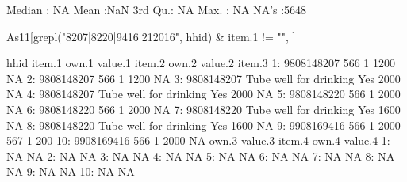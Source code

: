 \begin{Schunk}
\begin{Soutput}
 Median : NA   
 Mean   :NaN   
 3rd Qu.: NA   
 Max.   : NA   
 NA's   :5648  
\end{Soutput}
\begin{Sinput}
As11[grepl("8207|8220|9416|212016", hhid) & item.1 != "", ]
\end{Sinput}
\begin{Soutput}
          hhid                 item.1 own.1 value.1 item.2 own.2 value.2 item.3
 1: 9808148207                    566     1    1200                   NA       
 2: 9808148207                    566     1    1200                   NA       
 3: 9808148207 Tube well for drinking   Yes    2000                   NA       
 4: 9808148207 Tube well for drinking   Yes    2000                   NA       
 5: 9808148220                    566     1    2000                   NA       
 6: 9808148220                    566     1    2000                   NA       
 7: 9808148220 Tube well for drinking   Yes    1600                   NA       
 8: 9808148220 Tube well for drinking   Yes    1600                   NA       
 9: 9908169416                    566     1    2000    567     1     200       
10: 9908169416                    566     1    2000                   NA       
    own.3 value.3 item.4 own.4 value.4
 1:            NA                   NA
 2:            NA                   NA
 3:            NA                   NA
 4:            NA                   NA
 5:            NA                   NA
 6:            NA                   NA
 7:            NA                   NA
 8:            NA                   NA
 9:            NA                   NA
10:            NA                   NA
\end{Soutput}
\end{Schunk}
